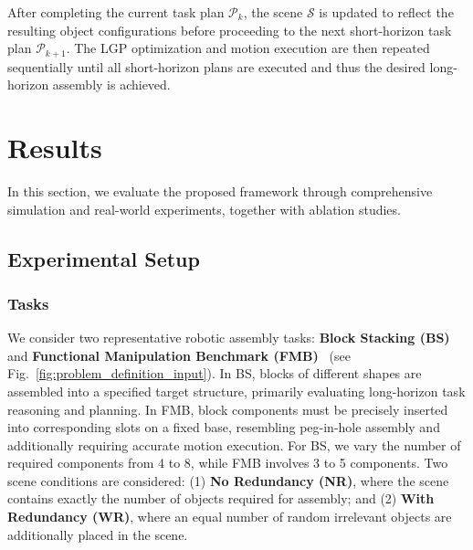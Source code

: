 \documentclass[letterpaper, 10 pt, conference]{ieeeconf}  %
\begin{document}
After completing the current task plan $\mathcal{P}_k$, the scene $\mathcal{S}$ is updated to reflect the resulting object configurations before proceeding to the next short-horizon task plan $\mathcal{P}_{k+1}$. 
The LGP optimization and motion execution are then repeated sequentially until all short-horizon plans are executed and thus the desired long-horizon assembly is achieved.


\section{Results}
\label{sec:results}

In this section, we evaluate the proposed framework through comprehensive simulation and real-world experiments, together with ablation studies.

\subsection{Experimental Setup}
\label{subsec:setup}

\subsubsection{Tasks} 
We consider two representative robotic assembly tasks: \textbf{Block Stacking (BS)} and \textbf{Functional Manipulation Benchmark (FMB)}~\cite{luo2024fmb} (see Fig.~\ref{fig:problem_definition_input}). 
In BS, blocks of different shapes are assembled into a specified target structure, primarily evaluating long-horizon task reasoning and planning. 
In FMB, block components must be precisely inserted into corresponding slots on a fixed base, resembling peg-in-hole assembly and additionally requiring accurate motion execution.
For BS, we vary the number of required components from 4 to 8, while FMB involves 3 to 5 components.  
Two scene conditions are considered: (1) \textbf{No Redundancy (NR)}, where the scene contains exactly the number of objects required for assembly; and (2) \textbf{With Redundancy (WR)}, where an equal number of random irrelevant objects are additionally placed in the scene.
\end{document}
